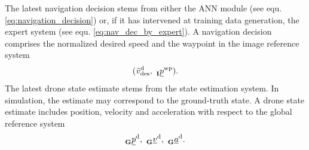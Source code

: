 The latest navigation decision
stems from either the ANN module
(see equ. \ref{eq:navigation_decision}) 
or, if it has intervened at training data generation,
the expert system (see equ. \ref{eq:nav_dec_by_expert}).
A navigation decision comprises the normalized desired speed 
and the waypoint in the image reference system
\begin{equation}
    (
        \speed[\norm]{\drone}{\desired}{}{}
        ,\ 
        \pos[]{\wayp}{}{\irs}{}
    ).
\end{equation}
The latest drone state estimate stems from the state estimation system.
In simulation, the estimate may correspond to the ground-truth state.
A drone state estimate includes position, velocity and acceleration
with respect to the global reference system
\begin{equation} \label{eq:drone_state}
    \pos[]{\drone}{}{\grs}{}
    ,\ 
    \vel[]{\drone}{}{\grs}{}
    ,\ 
    \acc[]{\drone}{}{\grs}{}.
\end{equation}


